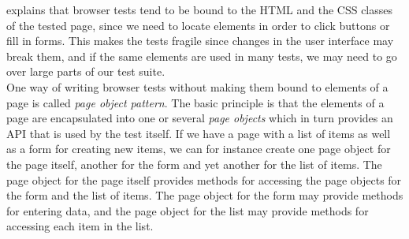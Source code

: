 \citet{web:page_object} explains that browser tests tend to be bound to
the HTML and the CSS classes of the tested page, since we need to locate
elements in order to click buttons or fill in forms. This makes the
tests fragile since changes in the user interface may break them, and if
the same elements are used in many tests, we may need to go over large
parts of our test suite.\\

One way of writing browser tests without making them bound to elements
of a page is called \emph{page object pattern}. The basic principle is
that the elements of a page are encapsulated into one or several
\emph{page objects} which in turn provides an API that is used by the
test itself. If we have a page with a list of items as well as a form for creating new items, we
can for instance create one page object for the page itself, another
for the form and yet another for the list of items. The page object for
the page itself provides methods for accessing the page objects for the
form and the list of items. The page object for the form may provide
methods for entering data, and the page object for the list may provide
methods for accessing each item in the list.\cite{web:page_object}

